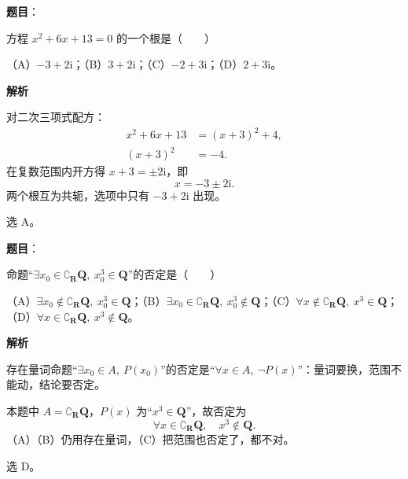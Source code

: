 

\begin{answer}

\textbf{题目}：

方程 $x^2+6x+13=0$ 的一个根是\mbox{（　　）}

（A）$-3+2\mathrm i$；（B）$3+2\mathrm i$；（C）$-2+3\mathrm i$；（D）$2+3\mathrm i$。

\textbf{解析}

对二次三项式配方：
\nopagebreak[4]
\[\begin{aligned}
x^2+6x+13&=(x+3)^2+4,\\
(x+3)^2&=-4.
\end{aligned}\]
在复数范围内开方得 $x+3=\pm2\mathrm i$，即
\nopagebreak[4]
\[x=-3\pm2\mathrm i.\]
两个根互为共轭，选项中只有 $-3+2\mathrm i$ 出现。

选 A。


\end{answer}
\begin{answer}

\textbf{题目}：

命题“$\exists x_0\in\complement_{\mathbf R}\mathbf Q,\ x_0^3\in\mathbf Q$”的否定是\mbox{（　　）}

（A）$\exists x_0\notin\complement_{\mathbf R}\mathbf Q,\ x_0^3\in\mathbf Q$；（B）$\exists x_0\in\complement_{\mathbf R}\mathbf Q,\ x_0^3\notin\mathbf Q$；（C）$\forall x\notin\complement_{\mathbf R}\mathbf Q,\ x^3\in\mathbf Q$；（D）$\forall x\in\complement_{\mathbf R}\mathbf Q,\ x^3\notin\mathbf Q$。

\textbf{解析}

存在量词命题“$\exists x_0\in A,\ P(x_0)$”的否定是“$\forall x\in A,\ \lnot P(x)$”：量词要换，范围不能动，结论要否定。

本题中 $A=\complement_{\mathbf R}\mathbf Q$，$P(x)$ 为“$x^3\in\mathbf Q$”，故否定为
\nopagebreak[4]
\[\forall x\in\complement_{\mathbf R}\mathbf Q,\quad x^3\notin\mathbf Q.\]
（A）（B）仍用存在量词，（C）把范围也否定了，都不对。

选 D。


\end{answer}

